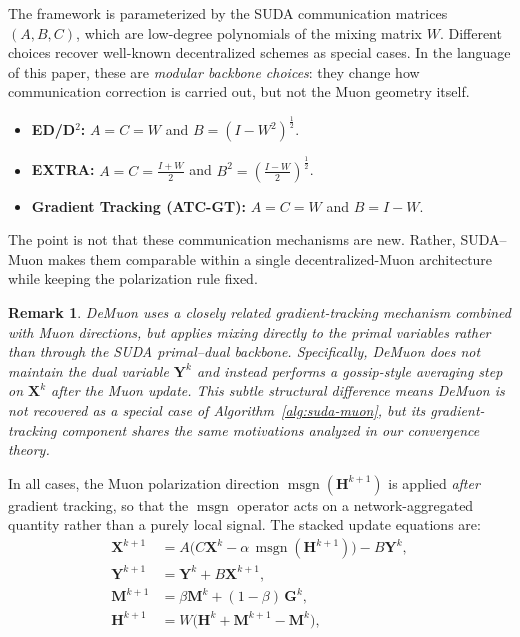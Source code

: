 \documentclass{article}
\newtheorem{remark}{Remark}
\newcommand{\sudamuon}{SUDA--Muon}
\begin{document}
The framework is parameterized by the SUDA communication matrices $(A,B,C)$, which are low-degree polynomials of the mixing matrix $W$.
Different choices recover well-known decentralized schemes as special cases. In the language of this paper, these are \emph{modular backbone choices}: they change how communication correction is carried out, but not the Muon geometry itself.
\begin{itemize}
\item \textbf{ED/D$^2$:} $A=C=W$ and $B=(I-W^2)^{\frac{1}{2}}$.
\item \textbf{EXTRA:} $A=C=\frac{I+W}{2}$ and $B^2=(\frac{I-W}{2})^{\frac{1}{2}}$.
\item \textbf{Gradient Tracking (ATC-GT):} $A=C=W$ and $B=I-W$.
\end{itemize}
The point is not that these communication mechanisms are new. Rather, \sudamuon{} makes them comparable within a single decentralized-Muon architecture while keeping the polarization rule fixed.
\begin{remark}
DeMuon \citep{he2025demuon} uses a closely related gradient-tracking mechanism combined with Muon directions, but applies mixing directly to the primal variables rather than through the SUDA primal--dual backbone. Specifically, DeMuon does not maintain the dual variable $\mathbf{Y}^k$ and instead performs a gossip-style averaging step on $\mathbf{X}^k$ after the Muon update. This subtle structural difference means DeMuon is not recovered as a special case of Algorithm~\ref{alg:suda-muon}, but its gradient-tracking component shares the same motivations analyzed in our convergence theory.
\end{remark}
In all cases, the Muon polarization direction $\operatorname{msgn}(\mathbf{H}^{k+1})$ is applied \emph{after} gradient tracking, so that the $\operatorname{msgn}$ operator acts on a network-aggregated quantity rather than a purely local signal.
The stacked update equations are:
\begin{equation}
\label{eq:sudamuon-framework}
\begin{aligned}
\mathbf{X}^{k+1} &= A\bigl(C\mathbf{X}^k - \alpha\,\operatorname{msgn}(\mathbf{H}^{k+1})\bigr) - B\mathbf{Y}^k,\\
\mathbf{Y}^{k+1} &= \mathbf{Y}^k + B\mathbf{X}^{k+1},\\
\mathbf{M}^{k+1} &= \beta\mathbf{M}^{k} + (1-\beta)\,\mathbf{G}^{k},\\
\mathbf{H}^{k+1} &= W\bigl(\mathbf{H}^k + \mathbf{M}^{k+1}-\mathbf{M}^{k}\bigr),
\end{aligned}
\end{equation}
\end{document}
